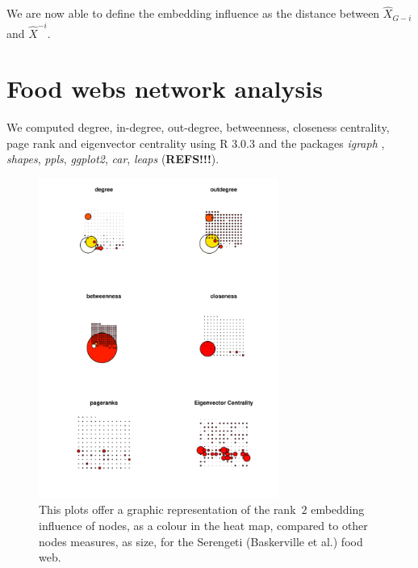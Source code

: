 \documentclass[12pt]{article}
\theoremstyle{definition}
\begin{document}
We are now able to define the embedding influence as the distance between $\hat{X}_{G - i}$ and $\hat{X}^{- i}$.

\newpage

\section{Food webs network analysis}

We computed degree, in-degree, out-degree, betweenness, closeness centrality, page rank and eigenvector centrality using R 3.0.3 \cite{team2012r} and the packages \emph{igraph}  \cite{Csardiigraph}, \emph{shapes}, \emph{ppls}, \emph{ggplot2}, \emph{car}, \emph{leaps} (\textbf{REFS!!!}).

\begin{figure}[ht]\label{fig:Serengeti_embeddingstress_d2}
\centering
\includegraphics[width=0.7\textwidth]{Images/influence_statistics_Serengeti_Baskerville_2.pdf}
\caption{This plots offer a graphic representation of the rank~$2$ embedding influence of nodes, as a colour in the heat map, compared to other nodes measures, as size, for the Serengeti (Baskerville et al.) food web.}
\end{figure}
\end{document}
